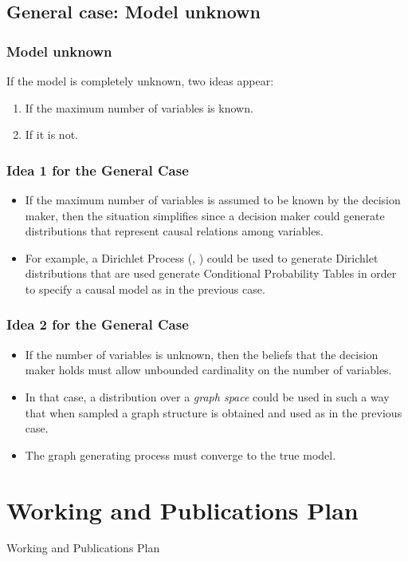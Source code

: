 \documentclass{beamer}
\theoremstyle{plain}
\begin{document}
\subsection{General case: Model unknown}
\begin{frame}
\frametitle{Model unknown}
If the model is completely unknown, two ideas appear:
\begin{enumerate}
\item If the maximum number of variables is known.
\item If it is not.
\end{enumerate}
\end{frame}
\begin{frame}
\frametitle{Idea 1 for the General Case}
\begin{itemize}
\item If the maximum number of variables is assumed to be known by the decision maker, then the situation simplifies since a decision maker could generate distributions that represent causal relations among variables.
\item For example, a Dirichlet Process (\cite{ferguson1973bayesian}, \cite{ghosal2017fundamentals}) could be used to generate Dirichlet distributions that are used generate Conditional Probability Tables in order to specify a causal model as in the previous case.
\end{itemize}
\end{frame}

\begin{frame}
\frametitle{Idea 2 for the General Case}
\begin{itemize}
\item If the number of variables is unknown, then the beliefs that the decision maker holds must allow unbounded cardinality on the number of variables. 
\item In that case, a distribution over a \textit{graph space} could be used in such a way that when sampled a graph structure is obtained and used as in the previous case.  
\item The graph generating process must converge to the true model.
\end{itemize}
\end{frame}

\section{Working and Publications Plan}
\begin{frame}
Working and Publications Plan
\end{frame}
\end{document}

